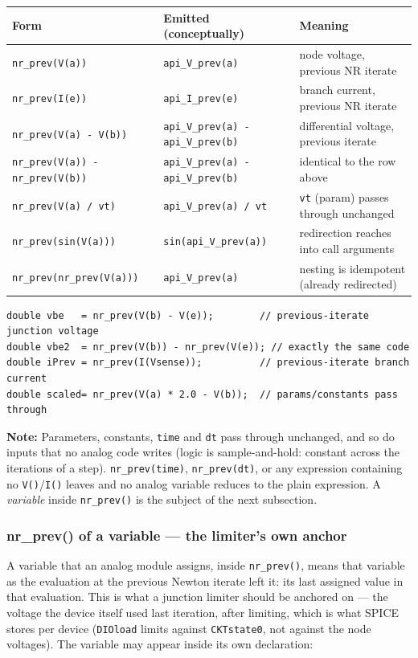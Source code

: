 \documentclass[11pt, a4paper]{article}
\newcommand{\code}[1]{\texttt{\small #1}}
\begin{document}
\begin{center}
\begin{tabular}{@{} L{4.3cm} L{4.6cm} L{4.4cm} @{}}
\toprule
\textbf{Form} & \textbf{Emitted (conceptually)} & \textbf{Meaning} \\
\midrule
\code{nr\_prev(V(a))}            & \code{api\_V\_prev(a)}                       & node voltage, previous NR iterate \\
\code{nr\_prev(I(e))}            & \code{api\_I\_prev(e)}                       & branch current, previous NR iterate \\
\code{nr\_prev(V(a) - V(b))}     & \code{api\_V\_prev(a) - api\_V\_prev(b)}     & differential voltage, previous iterate \\
\code{nr\_prev(V(a)) - nr\_prev(V(b))} & \code{api\_V\_prev(a) - api\_V\_prev(b)} & identical to the row above \\
\code{nr\_prev(V(a) / vt)}       & \code{api\_V\_prev(a) / vt}                  & \code{vt} (param) passes through unchanged \\
\code{nr\_prev(sin(V(a)))}       & \code{sin(api\_V\_prev(a))}                  & redirection reaches into call arguments \\
\code{nr\_prev(nr\_prev(V(a)))}  & \code{api\_V\_prev(a)}                       & nesting is idempotent (already redirected) \\
\bottomrule
\end{tabular}
\end{center}

\begin{lstlisting}
double vbe   = nr_prev(V(b) - V(e));        // previous-iterate junction voltage
double vbe2  = nr_prev(V(b)) - nr_prev(V(e)); // exactly the same code
double iPrev = nr_prev(I(Vsense));          // previous-iterate branch current
double scaled= nr_prev(V(a) * 2.0 - V(b));  // params/constants pass through
\end{lstlisting}

\textbf{Note:} Parameters, constants, \code{time} and \code{dt} pass through
unchanged, and so do inputs that no analog code writes (logic is
sample-and-hold: constant across the iterations of a step).
\code{nr\_prev(time)}, \code{nr\_prev(dt)}, or any expression containing no
\code{V()}/\code{I()} leaves and no analog variable reduces to the plain
expression. A \textit{variable} inside \code{nr\_prev()} is the subject of the
next subsection.

\subsubsection{nr\_prev() of a variable --- the limiter's own anchor}
A variable that an analog module assigns, inside \code{nr\_prev()}, means that
variable as the evaluation at the previous Newton iterate left it: its last
assigned value in that evaluation. This is what a junction limiter should be
anchored on --- the voltage the device itself used last iteration, after
limiting, which is what SPICE stores per device (\code{DIOload} limits against
\code{CKTstate0}, not against the node voltages). The variable may appear inside
its own declaration:
\end{document}
